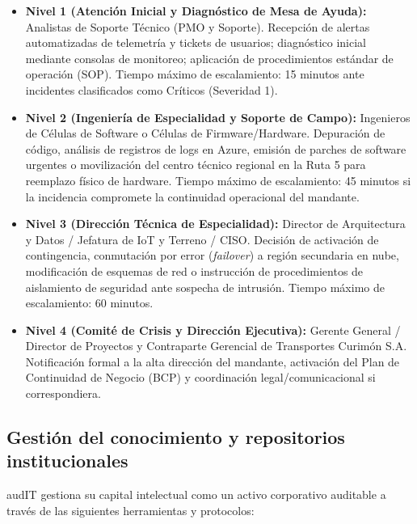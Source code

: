 \begin{itemize}
  \item \textbf{Nivel 1 (Atención Inicial y Diagnóstico de Mesa de Ayuda):} Analistas de Soporte Técnico (PMO y Soporte). Recepción de alertas automatizadas de telemetría y tickets de usuarios; diagnóstico inicial mediante consolas de monitoreo; aplicación de procedimientos estándar de operación (SOP). Tiempo máximo de escalamiento: 15 minutos ante incidentes clasificados como Críticos (Severidad 1).
  \item \textbf{Nivel 2 (Ingeniería de Especialidad y Soporte de Campo):} Ingenieros de Células de Software o Células de Firmware/Hardware. Depuración de código, análisis de registros de logs en Azure, emisión de parches de software urgentes o movilización del centro técnico regional en la Ruta 5 para reemplazo físico de hardware. Tiempo máximo de escalamiento: 45 minutos si la incidencia compromete la continuidad operacional del mandante.
  \item \textbf{Nivel 3 (Dirección Técnica de Especialidad):} Director de Arquitectura y Datos / Jefatura de IoT y Terreno / CISO. Decisión de activación de contingencia, conmutación por error (\textit{failover}) a región secundaria en nube, modificación de esquemas de red o instrucción de procedimientos de aislamiento de seguridad ante sospecha de intrusión. Tiempo máximo de escalamiento: 60 minutos.
  \item \textbf{Nivel 4 (Comité de Crisis y Dirección Ejecutiva):} Gerente General / Director de Proyectos y Contraparte Gerencial de Transportes Curimón S.A. Notificación formal a la alta dirección del mandante, activación del Plan de Continuidad de Negocio (BCP) y coordinación legal/comunicacional si correspondiera.
\end{itemize}

\subsection{Gestión del conocimiento y repositorios institucionales}\label{sec:1-conocimiento}

audIT gestiona su capital intelectual como un activo corporativo auditable a través de las siguientes herramientas y protocolos:

